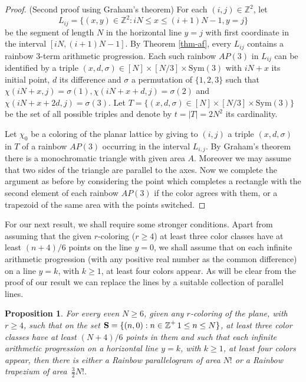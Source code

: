 \documentclass[a4paper, 11pt,reqno]{amsart}
\newtheorem{proposition}{Proposition}
\theoremstyle{definition}
\newcommand{\Z}{\mbox{${\mathbb Z}$}}
\begin{document}
\begin{proof} (Second proof using Graham's theorem)
For each $(i,j)\in \Z^2$, let
\[
L_{ij}=\{(x,y)\in \Z^2: iN\le x \le (i+1)N-1, y=j\}
\]
be the segment of length $N$ in the horizontal line $y=j$ with first coordinate in the interval $[iN,(i+1)N-1]$.
By Theorem \ref{thm-af}, every $L_{ij}$ contains a rainbow  $3$-term arithmetic progression.  Each such rainbow
$AP(3)$ in $L_{ij}$  can be identified by a triple $(x,d,\sigma)\in [N]\times [N/3]\times \text{Sym}(3)$ with
$iN+x$ its initial point, $d$  its difference and $\sigma$ a permutation of $\{1,2,3\}$ such that $\chi (iN+x,j)=\sigma(1),
\chi (iN+x+d,j)=\sigma(2)$ and $\chi(iN+x+2d,j)=\sigma (3)$. Let $T=\{(x,d,\sigma)\in [N]\times [N/3]\times \text{Sym}(3)\}$
be the set of all possible triples  and denote by  $t=|T|=2N^2$ its cardinality.

Let $\chi_0$ be a coloring of the planar lattice by giving to $(i,j)$ a triple $(x,d,\sigma)$ in $T$ of a rainbow $AP(3)$
occurring in the interval $L_{i,j}$. By Graham's theorem there is a monochromatic triangle with given area $A$. Moreover
we may assume that two sides of the triangle are parallel to the axes. Now we complete the argument as before by considering
the point which completes a rectangle with the second element of each rainbow $AP(3)$ if the color agrees with them, or a
trapezoid of the same area with the points switched.
\end{proof}


For our next result, we shall require some stronger conditions.
Apart from assuming that the given $r$-coloring ($r \geq 4$)
at least three color classes have at least $(n+4)/6$ points on the line $y=0$, we shall assume that
on each infinite arithmetic progression (with any positive real number as the common difference)
 on a line $y=k$, with $k \geq 1$, at least four colors appear.
As will be clear from the proof of our result  we can replace the lines
by a suitable collection of parallel lines.



\begin{proposition}
For every even $N\ge 6$, given any $r$-coloring of the plane, with $r \geq 4$,
such that on the
set ${\bf S}= \{(n,0): n \in \Z^+\, 1 \leq n \leq N\}$, at least three color classes have
at least $(N+4)/6$ points in  them and such that each infinite arithmetic progression on a horizontal line $y=k$, with $k \geq 1$,
at least four colors appear, then there is either a Rainbow parallelogram
of area $N!$ or a Rainbow trapezium of area~$\frac{3}{2}N!$.
\end{proposition}
\end{document}
